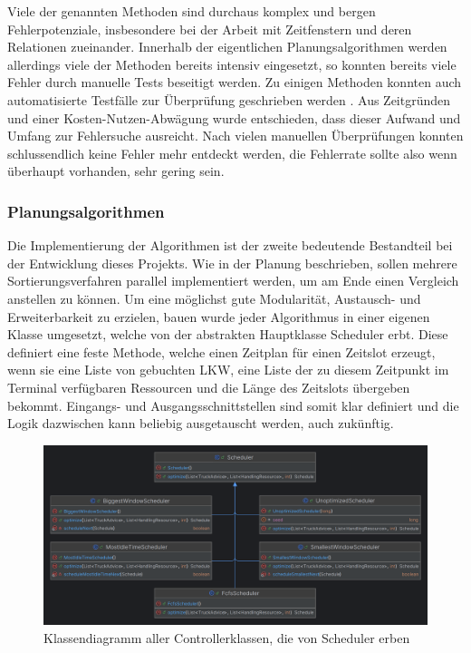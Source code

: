 Viele der genannten Methoden sind durchaus komplex und bergen Fehlerpotenziale, insbesondere bei der Arbeit mit Zeitfenstern und deren Relationen zueinander. Innerhalb der eigentlichen Planungsalgorithmen werden allerdings viele der Methoden bereits intensiv eingesetzt, so konnten bereits viele Fehler durch manuelle Tests beseitigt werden. Zu einigen Methoden konnten auch automatisierte Testfälle zur Überprüfung geschrieben werden . Aus Zeitgründen und einer Kosten-Nutzen-Abwägung wurde entschieden, dass dieser Aufwand und Umfang zur Fehlersuche ausreicht. Nach vielen manuellen Überprüfungen konnten schlussendlich keine Fehler mehr entdeckt werden, die Fehlerrate sollte also wenn überhaupt vorhanden, sehr gering sein.



\subsubsection{Planungsalgorithmen}

Die Implementierung der Algorithmen ist der zweite bedeutende Bestandteil bei der Entwicklung dieses Projekts. Wie in der Planung beschrieben, sollen mehrere Sortierungsverfahren parallel implementiert werden, um am Ende einen Vergleich anstellen zu können. Um eine möglichst gute Modularität, Austausch- und Erweiterbarkeit zu erzielen, bauen wurde jeder Algorithmus in einer eigenen Klasse umgesetzt, welche von der abstrakten Hauptklasse Scheduler erbt. Diese definiert eine feste Methode, welche einen Zeitplan für einen Zeitslot erzeugt, wenn sie eine Liste von gebuchten LKW, eine Liste der zu diesem Zeitpunkt im Terminal verfügbaren Ressourcen und die Länge des Zeitslots übergeben bekommt. Eingangs- und Ausgangsschnittstellen sind somit klar definiert und die Logik dazwischen kann beliebig ausgetauscht werden, auch zukünftig.

\begin{figure}[H]
    \centering
    \includegraphics[width=\textwidth]{images/classDiagrams/Scheduler_ClassDiagram.png}
    \caption{Klassendiagramm aller Controllerklassen, die von Scheduler erben}
    \label{fig:classDiagramScheduler}
\end{figure}

